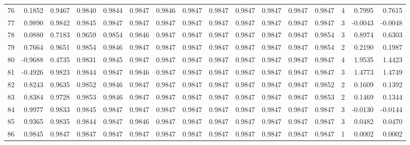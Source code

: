 \begin{tabular}{lrrrrrrrrrrrrrrr}
76  &      0.1852 &  0.9467 &  0.9840 &  0.9844 &  0.9847 &  0.9846 &  0.9847 &  0.9847 &  0.9847 &  0.9847 &   0.9847 &     0.9847 &      4 &                    0.7995 &                     0.7615 \\
77  &      0.9890 &  0.9842 &  0.9845 &  0.9847 &  0.9847 &  0.9847 &  0.9847 &  0.9847 &  0.9847 &  0.9847 &   0.9847 &     0.9847 &      3 &                   -0.0043 &                    -0.0048 \\
78  &      0.0880 &  0.7183 &  0.9659 &  0.9854 &  0.9846 &  0.9847 &  0.9847 &  0.9847 &  0.9847 &  0.9847 &   0.9847 &     0.9854 &      3 &                    0.8974 &                     0.6303 \\
79  &      0.7664 &  0.9651 &  0.9854 &  0.9846 &  0.9847 &  0.9847 &  0.9847 &  0.9847 &  0.9847 &  0.9847 &   0.9847 &     0.9854 &      2 &                    0.2190 &                     0.1987 \\
80  &     -0.9688 &  0.4735 &  0.9831 &  0.9845 &  0.9847 &  0.9847 &  0.9847 &  0.9847 &  0.9847 &  0.9847 &   0.9847 &     0.9847 &      4 &                    1.9535 &                     1.4423 \\
81  &     -0.4926 &  0.9823 &  0.9844 &  0.9847 &  0.9846 &  0.9847 &  0.9847 &  0.9847 &  0.9847 &  0.9847 &   0.9847 &     0.9847 &      3 &                    1.4773 &                     1.4749 \\
82  &      0.8243 &  0.9635 &  0.9852 &  0.9846 &  0.9847 &  0.9847 &  0.9847 &  0.9847 &  0.9847 &  0.9847 &   0.9847 &     0.9852 &      2 &                    0.1609 &                     0.1392 \\
83  &      0.8384 &  0.9728 &  0.9853 &  0.9846 &  0.9847 &  0.9847 &  0.9847 &  0.9847 &  0.9847 &  0.9847 &   0.9847 &     0.9853 &      2 &                    0.1469 &                     0.1344 \\
84  &      0.9977 &  0.9833 &  0.9845 &  0.9847 &  0.9847 &  0.9847 &  0.9847 &  0.9847 &  0.9847 &  0.9847 &   0.9847 &     0.9847 &      3 &                   -0.0130 &                    -0.0144 \\
85  &      0.9365 &  0.9835 &  0.9844 &  0.9847 &  0.9846 &  0.9847 &  0.9847 &  0.9847 &  0.9847 &  0.9847 &   0.9847 &     0.9847 &      3 &                    0.0482 &                     0.0470 \\
86  &      0.9845 &  0.9847 &  0.9847 &  0.9847 &  0.9847 &  0.9847 &  0.9847 &  0.9847 &  0.9847 &  0.9847 &   0.9847 &     0.9847 &      1 &                    0.0002 &                     0.0002 \\

\end{tabular}
